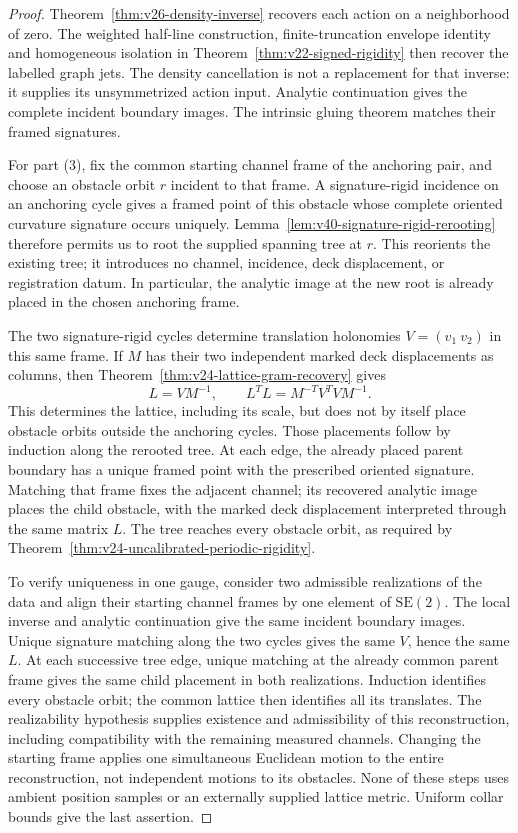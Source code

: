 \begin{proof}
Theorem~\ref{thm:v26-density-inverse} recovers each action on a neighborhood
of zero.  The weighted half-line construction, finite-truncation envelope
identity and homogeneous isolation in
Theorem~\ref{thm:v22-signed-rigidity} then recover the labelled graph jets.
The density cancellation is not a replacement for that inverse: it supplies
its unsymmetrized action input.  Analytic continuation gives the complete
incident boundary images.  The intrinsic gluing theorem matches their
framed signatures.

For part (3), fix the common starting channel frame of the anchoring
pair, and choose an obstacle orbit \(r\) incident to that frame.
A signature-rigid incidence on an anchoring cycle gives a framed point
of this obstacle whose complete oriented curvature signature occurs
uniquely.  Lemma~\ref{lem:v40-signature-rigid-rerooting} therefore permits
us to root the supplied spanning tree at \(r\).  This reorients the
existing tree; it introduces no channel, incidence, deck displacement,
or registration datum.  In particular, the analytic image at the new
root is already placed in the chosen anchoring frame.

The two signature-rigid cycles determine translation holonomies
\(V=(v_1\ v_2)\) in this same frame.  If \(M\) has their two independent
marked deck displacements as columns, then
Theorem~\ref{thm:v24-lattice-gram-recovery} gives
\[
                 L=VM^{-1},\qquad
                 L^TL=M^{-T}V^TVM^{-1}.
\]
This determines the lattice, including its scale, but does not by itself
place obstacle orbits outside the anchoring cycles.  Those placements
follow by induction along the rerooted tree.  At each edge, the already
placed parent boundary has a unique framed point with the prescribed
oriented signature.  Matching that frame fixes the adjacent channel;
its recovered analytic image places the child obstacle, with the marked
deck displacement interpreted through the same matrix \(L\).
The tree reaches every obstacle orbit, as required by
Theorem~\ref{thm:v24-uncalibrated-periodic-rigidity}.

To verify uniqueness in one gauge, consider two admissible realizations
of the data and align their starting channel frames by one element of
\(\mathrm{SE}(2)\).  The local inverse and analytic continuation give
the same incident boundary images.  Unique signature matching along the
two cycles gives the same \(V\), hence the same \(L\).  At each successive
tree edge, unique matching at the already common parent frame gives the
same child placement in both realizations.  Induction identifies every
obstacle orbit; the common lattice then identifies all its translates.
The realizability hypothesis supplies existence and admissibility of
this reconstruction, including compatibility with the remaining measured
channels.  Changing the starting frame applies one simultaneous Euclidean
motion to the entire reconstruction, not independent motions to its
obstacles.  None of these steps uses ambient position samples or an
externally supplied lattice metric.
Uniform collar bounds give the last assertion.
\end{proof}

